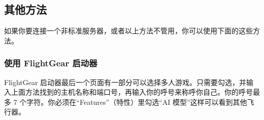 \ifchinese
\subsection{其他方法}

如果你要连接一个非标准服务器，或者以上方法不管用，你可以使用下面的这些方法。
\fi
\iffalse
\IfLanguageName{english}{
\subsection{Other Methods}

If you are connecting to a non-standard server, or the above method does not work, you can also connect
using the methods below.
}{}
\fi
{}

\ifchinese
\subsubsection{使用 FlightGear 启动器}

FlightGear 启动器最后一个页面有一部分可以选择多人游戏。只需要勾选，并输入上面方法找到的主机名称和端口号，再输入你的呼号来称呼你自己。你的呼号最多 7 个字符。你必须在“Features”（特性）里勾选“AI 模型”这样可以看到其他飞行器。
\fi
\iffalse
\IfLanguageName{english}{
\subsubsection{Using the FlightGear Launcher}

The final screen of the FlightGear Launcher has a section for Multiplayer.
Simply select the checkbox, enter the hostname and port
number you noted above and choose a callsign to identify yourself.
Your callsign can be up to 7 characters in length.
You must also check The AI models checkbox under Features to make other aircraft visible.
}{}
\fi


